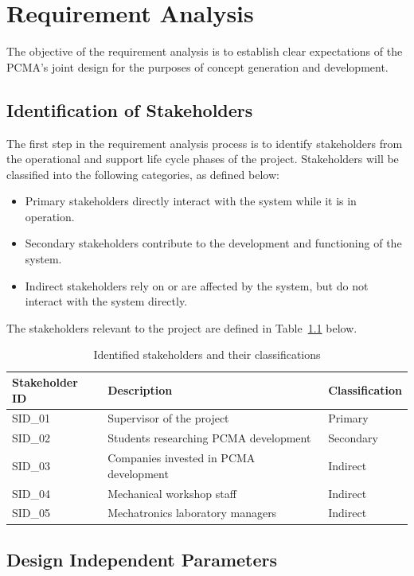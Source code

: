 \chapter{Requirement Analysis}

The objective of the requirement analysis is to establish clear expectations of the PCMA's joint design for the purposes of concept generation and development.

\section{Identification of Stakeholders}

The first step in the requirement analysis process is to identify stakeholders from the operational and support life cycle phases of the project. Stakeholders will be classified into the following categories, as defined below:
\begin{itemize}
	\item Primary stakeholders directly interact with the system while it is in operation.
	\item Secondary stakeholders contribute to the development and functioning of the system.
	\item Indirect stakeholders rely on or are affected by the system, but do not interact with the system directly.
\end{itemize}
The stakeholders relevant to the project are defined in Table~\ref{tab:SID table} below.
\begin{table}[htbp]
	\centering
	\caption{Identified stakeholders and their classifications}
	\label{tab:SID table}
	\begin{tabular}{|l|l|l|}
		\hline
		\textbf{Stakeholder ID} & \textbf{Description} & \textbf{Classification} \\ \hline
		SID\_01 & Supervisor of the project & Primary \\ \hline
		SID\_02 & Students researching PCMA development & Secondary \\ \hline
		SID\_03 & Companies invested in PCMA development & Indirect\\ \hline
		SID\_04 & Mechanical workshop staff & Indirect \\ \hline
		SID\_05 & Mechatronics laboratory managers & Indirect \\ \hline
	\end{tabular}
\end{table}

\section{Design Independent Parameters}


